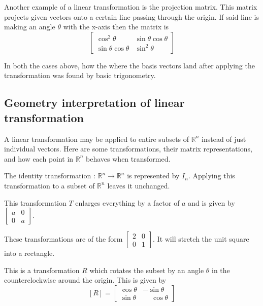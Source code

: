 \documentclass[12pt]{article}
\theoremstyle{remark}
\numberwithin{equation}{section}
\begin{document}
Another example of a linear transformation is the projection matrix. This matrix projects given vectors onto a certain line passing through the origin. If said line is making an angle $ \theta $ with the x-axis then the matrix is 
\[  
	\begin{bmatrix}
		\cos^{2}{\theta} & \sin{\theta}\cos{\theta} \\
		\sin{\theta}\cos{\theta} & \sin^{2}{\theta}
	\end{bmatrix}
\]

In both the cases above, how the where the basis vectors land after applying the transformation was found by basic trigonometry. 

\subsection{Geometry interpretation of linear transformation}%
\label{sub:Geometry interpretation of linear transformation}

A linear transformation may be applied to entire subsets of $ \mathbb{R}^n $ instead of just individual vectors. Here are some transformations, their matrix representations, and how each point in $ \mathbb{R}^n $ behaves when transformed. 

\begin{example}
	The identity transformation : $ \mathbb{R}^n \rightarrow \mathbb{R}^n $ is represented by $ I_{n} $. Applying this transformation to a subset of $ \mathbb{R}^n $ leaves it unchanged.  
\end{example}

\begin{example}
    This transformation $ T $ enlarges everything by a factor of $ a $ and is given by %
    $ \begin{bmatrix} a & 0 \\ 0 & a \end{bmatrix} $.   
\end{example}

\begin{example}
	These transformations are of the form $ \begin{bmatrix} 2 & 0 \\ 0 & 1 \end{bmatrix} $. It will stretch the unit square into a rectangle. 
\end{example}

\begin{example}
	This is a transformation $ R $ which rotates the subset by an angle $ \theta $ in the counterclockwise around the origin. This is given by 
	\[
	[R] = 
	 \begin{bmatrix}
		 \cos{\theta} & -\sin{\theta} \\
		 \sin{\theta} & \phantom{-}\cos{\theta}
	 \end{bmatrix}
	\]
\end{example}
\end{document}
